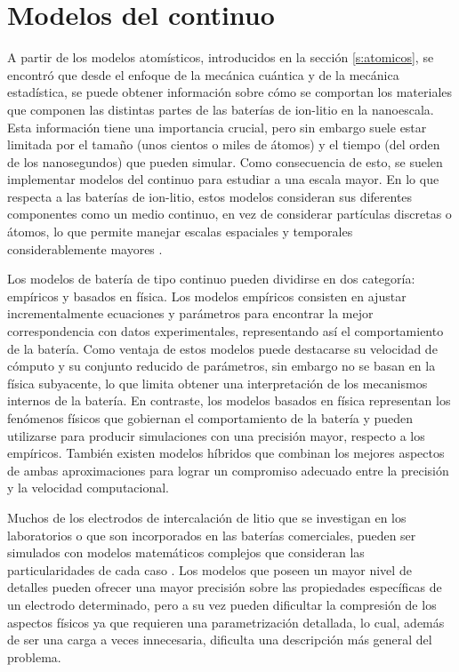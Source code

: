 \section{Modelos del continuo}

A partir de los modelos atomísticos, introducidos en la sección \ref{s:atomicos}, se encontró que desde 
el enfoque de la mecánica cuántica y de la mecánica estadística, se puede obtener
información sobre cómo se comportan los materiales que componen las
distintas partes de las baterías de ion-litio en la nanoescala. Esta información 
tiene una importancia crucial, pero sin embargo suele estar limitada por el tamaño
(unos cientos o miles de átomos) y el tiempo (del orden de los nanosegundos) que 
pueden simular. Como consecuencia de esto, se suelen implementar modelos del 
continuo para estudiar a una escala mayor. En lo que respecta a las baterías de 
ion-litio, estos modelos consideran sus diferentes componentes como un medio 
continuo, en vez de considerar partículas discretas o átomos, lo que permite
manejar escalas espaciales y temporales considerablemente mayores \cite{brosa2022}.

Los modelos de batería de tipo continuo pueden dividirse en dos categoría:
empíricos y basados en física. Los modelos empíricos consisten en ajustar 
incrementalmente ecuaciones y parámetros para encontrar la mejor correspondencia
con datos experimentales, representando así el comportamiento de la batería. 
Como ventaja de estos modelos puede destacarse su velocidad de cómputo y su
conjunto reducido de parámetros, sin embargo no se basan en la física subyacente, 
lo que limita obtener una interpretación de los mecanismos internos de la batería.
En contraste, los modelos basados en física representan los fenómenos físicos 
que gobiernan el comportamiento de la batería y pueden utilizarse para producir 
simulaciones con una precisión mayor, respecto a los empíricos. También existen
modelos híbridos que combinan los mejores aspectos de ambas aproximaciones para 
lograr un compromiso adecuado entre la precisión y la velocidad computacional.

Muchos de los electrodos de intercalación de litio que se investigan en los 
laboratorios o que son incorporados en las baterías comerciales, pueden ser 
simulados con modelos matemáticos complejos que consideran las particularidades 
de cada caso \cite{doyle1995}. Los modelos que poseen un mayor nivel de detalles 
pueden ofrecer una mayor precisión sobre las propiedades 
específicas de un electrodo determinado, pero a su vez pueden dificultar la 
compresión de los aspectos físicos ya que requieren una parametrización detallada, 
lo cual, además de ser una carga a veces innecesaria, dificulta una descripción 
más general del problema. 


